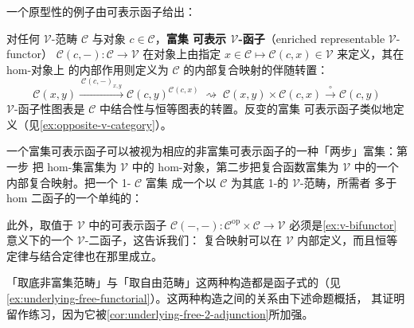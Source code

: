 一个原型性的例子由可表示函子给出：

\begin{example}\label{exa:enriched-representable}
对任何 $\mathcal{V}$-范畴 $\mathcal{C}$ 与对象 $c\in\mathcal{C}$，\textbf{富集
可表示 $\mathcal{V}$-函子}（enriched representable $\mathcal{V}$-functor）
$\mathcal{C}(c,-)\colon\mathcal{C}\to\mathcal{V}$ 在对象上由指定
$x\in\mathcal{C}\mapsto\mathcal{C}(c,x)\in\mathcal{V}$ 来定义，其在 hom-对象上
的内部作用则定义为 $\mathcal{C}$ 的内部复合映射的伴随转置：
\[ \mathcal{C}(x,y)\xrightarrow{\ \mathcal{C}(c,-)_{x,y}\ }
   \mathcal{C}(c,y)^{\mathcal{C}(c,x)}
   \;\rightsquigarrow\;
   \mathcal{C}(x,y)\times\mathcal{C}(c,x)\xrightarrow{\ \circ\ }
   \mathcal{C}(c,y) \]
$\mathcal{V}$-函子性图表是 $\mathcal{C}$ 中结合性与恒等图表的转置。反变的富集
可表示函子类似地定义（见\cref{ex:opposite-v-category}）。
\end{example}

\begin{remark}\label{rem:two-step-enrichment}
一个富集可表示函子可以被视为相应的非富集可表示函子的一种「两步」富集：第一步
把 hom-集富集为 $\mathcal{V}$ 中的 hom-对象，第二步把复合函数富集为
$\mathcal{V}$ 中的一个内部复合映射。把一个 1-\trCategory{} $\mathcal{C}$ 富集
成一个以 $\mathcal{C}$ 为其底 1-\trCategory{}的 $\mathcal{V}$-范畴，所需者
多于 hom 二函子的一个单纯的\trLifting：
\begin{center}
\end{center}
此外，取值于 $\mathcal{V}$ 中的可表示函子
$\mathcal{C}(-,-)\colon\mathcal{C}^{\mathrm{op}}\times\mathcal{C}\to\mathcal{V}$
必须是\cref{ex:v-bifunctor}意义下的一个 $\mathcal{V}$-二函子，这告诉我们：
复合映射可以在 $\mathcal{V}$ 内部定义，而且恒等定律与结合定律也在那里成立。
\end{remark}

「取底非富集范畴」与「取自由范畴」这两种构造都是函子式的（见%
\cref{ex:underlying-free-functorial}）。这两种构造之间的关系由下述命题概括，
其证明留作练习，因为它被\cref{cor:underlying-free-2-adjunction}所加强。

